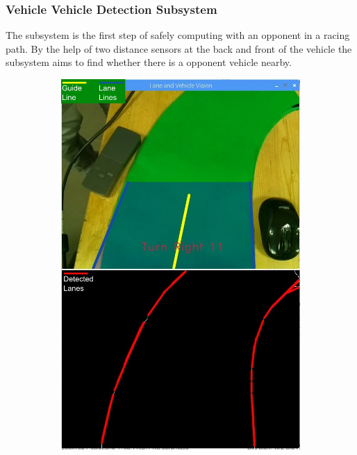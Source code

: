 \documentclass[a4paper,12pt]{article}
\begin{document}
	
	
	\subsubsection{Vehicle Vehicle Detection Subsystem}
	
		The subsystem is the first step of safely computing with an opponent in a racing path. By the help of two distance sensors at the back and front of the vehicle the subsystem aims to find whether there is a opponent vehicle nearby.
		
		
	\begin{figure}[H]
		\setlength{\unitlength}{\textwidth} 
		\centering
		\begin{subfigure}{.5\textwidth}
	  		\centering
	  		\includegraphics[width=0.48\unitlength]{images/detection1-legend}

\end{subfigure}
\end{figure}
\end{document}
